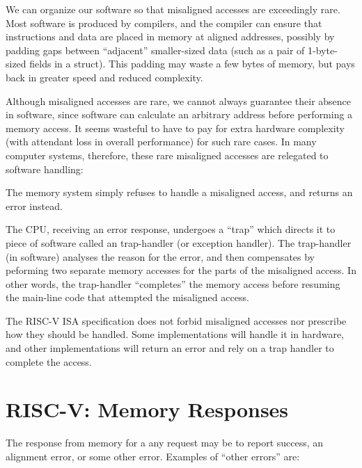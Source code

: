 We can organize our software so that misaligned accesses are
exceedingly rare.  Most software is produced by compilers, and the
compiler can ensure that instructions and data are placed in memory at
aligned addresses, possibly by padding gaps between ``adjacent''
smaller-sized data (such as a pair of 1-byte-sized fields in a
struct).  This padding may waste a few bytes of memory, but pays back
in greater speed and reduced complexity.

Although misaligned accesses are rare, we cannot always guarantee
their absence in software, since software can calculate an arbitrary
address before performing a memory access.  It seems wasteful to have
to pay for extra hardware complexity (with attendant loss in overall
performance) for such rare cases.  In many computer systems,
therefore, these rare misaligned accesses are relegated to software
handling:

\begin{tightlist}

\item The memory system simply refuses to handle a misaligned access,
  and returns an error instead.

\item The CPU, receiving an error response, undergoes a ``trap'' which
  directs it to piece of software called an trap-handler (or exception
  handler).  The trap-handler (in software) analyses the reason for
  the error, and then compensates by peforming two separate memory
  accesses for the parts of the misaligned access. In other words, the
  trap-handler ``completes'' the memory access before resuming the
  main-line code that attempted the misaligned access.

\end{tightlist}

The RISC-V ISA specification does not forbid misaligned accesses nor
prescribe how they should be handled.  Some implementations will
handle it in hardware, and other implementations will return an error
and rely on a trap handler to complete the access.


\section{RISC-V: Memory Responses}


The response from memory for a any request may be to report success,
an alignment error, or some other error.  Examples of ``other errors''
are:

